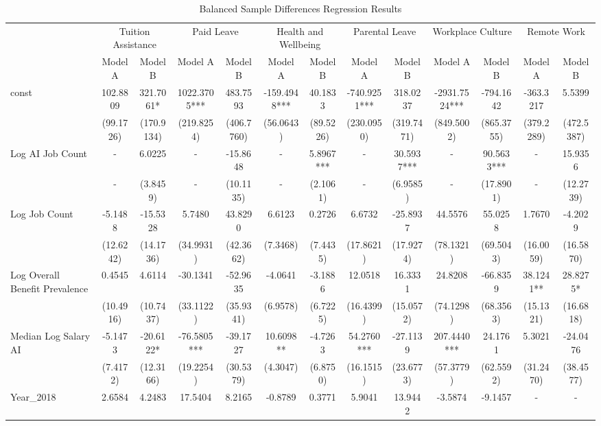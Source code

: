 \begin{table}[htbp]
\centering
\caption{Balanced Sample Differences Regression Results}
\begin{tabular}{lcccccccccccc}
\hline\hline
 & \multicolumn{2}{c}{Tuition Assistance} & \multicolumn{2}{c}{Paid Leave} & \multicolumn{2}{c}{Health and Wellbeing} & \multicolumn{2}{c}{Parental Leave} & \multicolumn{2}{c}{Workplace Culture} & \multicolumn{2}{c}{Remote Work} \\
 & Model A & Model B & Model A & Model B & Model A & Model B & Model A & Model B & Model A & Model B & Model A & Model B \\
\hline
const & 102.8809 & 321.7061* & 1022.3705*** & 483.7593 & -159.4948*** & 40.1833 & -740.9251*** & 318.0237 & -2931.7524*** & -794.1642 & -363.3217 & 5.5399 \\
 & (99.1726) & (170.9134) & (219.8254) & (406.7760) & (56.0643) & (89.5226) & (230.0950) & (319.7471) & (849.5002) & (865.3755) & (379.2289) & (472.5387) \\
Log AI Job Count & - & 6.0225 & - & -15.8648 & - & 5.8967*** & - & 30.5937*** & - & 90.5633*** & - & 15.9356 \\
 & - & (3.8459) & - & (10.1135) & - & (2.1061) & - & (6.9585) & - & (17.8901) & - & (12.2739) \\
Log Job Count & -5.1488 & -15.5328 & 5.7480 & 43.8290 & 6.6123 & 0.2726 & 6.6732 & -25.8937 & 44.5576 & 55.0258 & 1.7670 & -4.2029 \\
 & (12.6242) & (14.1736) & (34.9931) & (42.3662) & (7.3468) & (7.4435) & (17.8621) & (17.9274) & (78.1321) & (69.5043) & (16.0059) & (16.5870) \\
Log Overall Benefit Prevalence & 0.4545 & 4.6114 & -30.1341 & -52.9635 & -4.0641 & -3.1886 & 12.0518 & 16.3331 & 24.8208 & -66.8359 & 38.1241** & 28.8275* \\
 & (10.4916) & (10.7437) & (33.1122) & (35.9341) & (6.9578) & (6.7225) & (16.4399) & (15.0572) & (74.1298) & (68.3563) & (15.1321) & (16.6818) \\
Median Log Salary AI & -5.1473 & -20.6122* & -76.5805*** & -39.1727 & 10.6098** & -4.7263 & 54.2760*** & -27.1139 & 207.4440*** & 24.1761 & 5.3021 & -24.0476 \\
 & (7.4172) & (12.3166) & (19.2254) & (30.5379) & (4.3047) & (6.8750) & (16.1515) & (23.6773) & (57.3779) & (62.5592) & (31.2470) & (38.4577) \\
Year\_2018 & 2.6584 & 4.2483 & 17.5404 & 8.2165 & -0.8789 & 0.3771 & 5.9041 & 13.9442 & -3.5874 & -9.1457 & - & - \\

\end{tabular}
\end{table}
